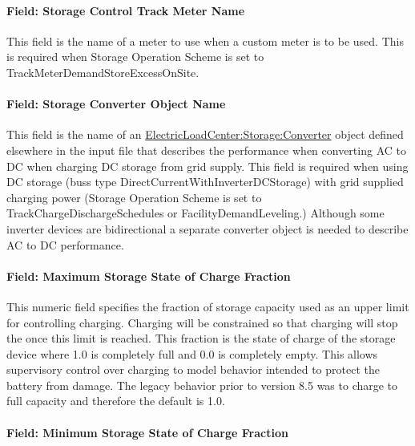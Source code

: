 \paragraph{Field: Storage Control Track Meter Name}\label{field-storage-control-track-meter-name}

This field is the name of a meter to use when a custom meter is to be used. This is required when Storage Operation Scheme is set to TrackMeterDemandStoreExcessOnSite.

\paragraph{Field: Storage Converter Object Name}\label{field-storage-converter-object-name}

This field is the name of an \hyperref[electricloadcenterstorageconverter]{ElectricLoadCenter:Storage:Converter} object defined elsewhere in the input file that describes the performance when converting AC to DC when charging DC storage from grid supply. This field is required when using DC storage (buss type DirectCurrentWithInverterDCStorage) with grid supplied charging power (Storage Operation Scheme is set to TrackChargeDischargeSchedules or FacilityDemandLeveling.) Although some inverter devices are bidirectional a separate converter object is needed to describe AC to DC performance.

\paragraph{Field: Maximum Storage State of Charge Fraction}\label{field-maximum-storage-state-of-charge-fraction}

This numeric field specifies the fraction of storage capacity used as an upper limit for controlling charging. Charging will be constrained so that charging will stop the once this limit is reached. This fraction is the state of charge of the storage device where 1.0 is completely full and 0.0 is completely empty. This allows supervisory control over charging to model behavior intended to protect the battery from damage. The legacy behavior prior to version 8.5 was to charge to full capacity and therefore the default is 1.0.

\paragraph{Field: Minimum Storage State of Charge Fraction}\label{field-minimum-storage-state-of-charge-fraction}

